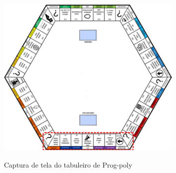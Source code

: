 \begin{figure}[H]
	\centering
	\caption{Captura de tela do tabuleiro de Prog-poly}
	\includegraphics[width=0.8\textwidth]{images/prog-poly.png}
	\label{fig:prog_poly}
\end{figure}
